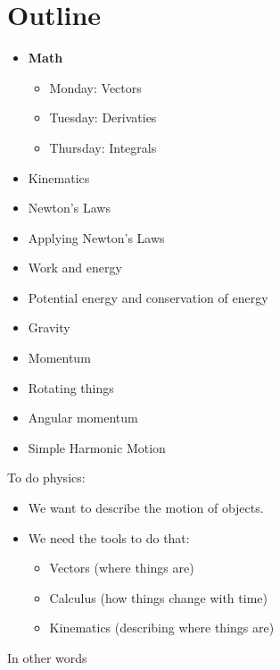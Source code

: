 \documentclass[aspectratio=169,
hyperref={colorlinks,urlcolor=blue}
]{beamer}
\begin{document}

\section{Outline}
\label{sec:outline}
{
\vspace{-0.4cm}
\begin{itemize}
\scriptsize
\item \textbf{Math}
  \begin{itemize}
  \scriptsize
   \item Monday: Vectors
   \item Tuesday: Derivaties
   \item Thursday: Integrals
 \end{itemize}
\item Kinematics 
\item Newton’s Laws 
\item Applying Newton’s Laws
\item Work and energy
\item Potential energy and conservation of energy
\item Gravity 
\item Momentum 
\item Rotating things 
\item Angular momentum
\item Simple Harmonic Motion
\end{itemize}
}
{
To do physics:
\begin{itemize}
\item We want to describe the motion of objects.
\item We need the tools to do that:
\begin{itemize}
\item Vectors (where things are)
\item Calculus (how things change with time)
\item Kinematics (describing where things are)
\end{itemize}
\end{itemize}
}


\begin{frame}{In other words}
\end{frame}
\end{document}
